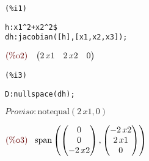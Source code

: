 \noindent
\begin{minipage}[t]{8ex}
\color{red}\bf
\begin{verbatim}
(%i1) 
\end{verbatim}
\end{minipage}
\begin{minipage}[t]{\textwidth}
\color{blue}
\begin{verbatim}
h:x1^2+x2^2$
dh:jacobian([h],[x1,x2,x3]);
\end{verbatim}
\end{minipage}
\begin{math}\displaystyle
\parbox{8ex}{\color{labelcolor}(\%o2) }
\begin{pmatrix}2\,x1 & 2\,x2 & 0\end{pmatrix}
\end{math}


\noindent
\begin{minipage}[t]{8ex}
\color{red}\bf
\begin{verbatim}
(%i3) 
\end{verbatim}
\end{minipage}
\begin{minipage}[t]{\textwidth}
\color{blue}
\begin{verbatim}
D:nullspace(dh);
\end{verbatim}
\end{minipage}
\begin{math}\displaystyle
Proviso: \mathrm{notequal}\left( 2\,x1,0\right) 
\end{math}

\noindent
\begin{math}\displaystyle
\parbox{8ex}{\color{labelcolor}(\%o3) }
\mathrm{span}\left( \begin{pmatrix}0\cr 0\cr -2\,x2\end{pmatrix},\begin{pmatrix}-2\,x2\cr 2\,x1\cr 0\end{pmatrix}\right) 
\end{math}
